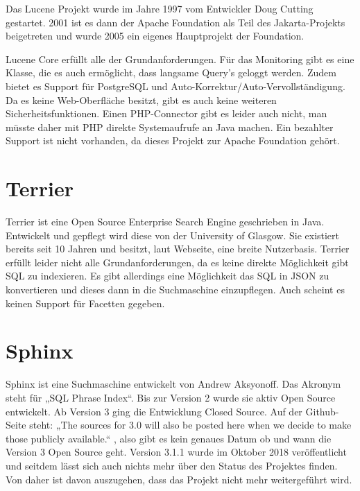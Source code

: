 Das Lucene Projekt wurde im Jahre 1997 vom Entwickler Doug Cutting gestartet. 2001 ist es dann der Apache Foundation als Teil des Jakarta-Projekts beigetreten und wurde 2005 ein eigenes Hauptprojekt der Foundation. \cite{Wikipedia.2019c}

Lucene Core erfüllt alle der Grundanforderungen. Für das Monitoring gibt es eine Klasse, die es auch ermöglicht, dass langsame Query’s geloggt werden. Zudem bietet es Support für PostgreSQL und Auto-Korrektur/Auto-Vervollständigung. Da es keine Web-Oberfläche besitzt, gibt es auch keine weiteren Sicherheitsfunktionen. Einen PHP-Connector gibt es leider auch nicht, man müsste daher mit PHP direkte Systemaufrufe an Java machen. Ein bezahlter Support ist nicht vorhanden, da dieses Projekt zur Apache Foundation gehört. \cite{TheApacheSoftwareFoundation.2019b}

\section{Terrier}
\label{terrier}

Terrier ist eine Open Source Enterprise Search Engine geschrieben in Java. Entwickelt und gepflegt wird diese von der University of Glasgow. Sie existiert bereits seit 10 Jahren und besitzt, laut Webseite, eine breite Nutzerbasis. 
Terrier erfüllt leider nicht alle Grundanforderungen, da es keine direkte Möglichkeit gibt SQL zu indexieren. Es gibt allerdings eine Möglichkeit das SQL in JSON zu konvertieren und dieses dann in die Suchmaschine einzupflegen. Auch scheint es keinen Support für Facetten gegeben.
\cite{McCreadie.2019}

\section{Sphinx}
\label{sphinx}

Sphinx ist eine Suchmaschine entwickelt von Andrew Aksyonoff. Das Akronym steht für „SQL Phrase Index“.\cite{SphinxTechnologiesInc.b} Bis zur Version 2 wurde sie aktiv Open Source entwickelt. Ab Version 3 ging die Entwicklung Closed Source. Auf der Github-Seite steht: „The sources for 3.0 will also be posted here when we decide to make those publicly available.“ \cite{sphinxserach.2019}, also gibt es kein genaues Datum ob und wann die Version 3 Open Source geht. Version 3.1.1 wurde im Oktober 2018 veröffentlicht und seitdem lässt sich auch nichts mehr über den Status des Projektes finden. Von daher ist davon auszugehen, dass das Projekt nicht mehr weitergeführt wird. 

